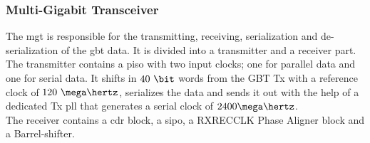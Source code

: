 \documentclass[main.tex]{subfiles}
\begin{document}
\subsubsection{Multi-Gigabit Transceiver}
The \gls{mgt} is responsible for the transmitting, receiving, serialization and de-serialization of the \gls{gbt} data. It is divided into a transmitter and a receiver part.\\ The transmitter contains a \gls{piso} with two input clocks; one for parallel data and one for serial data. It shifts in $40~\bit$ words from the GBT Tx with a reference clock of $120~\mega\hertz$, serializes the data and sends it out with the help of a dedicated Tx \gls{pll} that generates a serial clock of $2400 \mega\hertz$.\\ The receiver contains a \gls{cdr} block, a \gls{sipo}, a RXRECCLK Phase Aligner block and a Barrel-shifter. 



\end{document}
